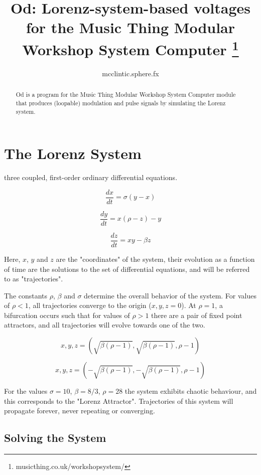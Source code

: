 \documentclass{tufte-handout}
\title{Od: Lorenz-system-based voltages for the Music Thing Modular Workshop System Computer
\thanks{musicthing.co.uk/workshopsystem/}}
\author[mcclintic.sphere.fx]{mcclintic.sphere.fx}
\begin{document}
\maketitle%

\begin{abstract}
\noindent
Od is a program for the Music Thing Modular Workshop System Computer
module that produces (loopable) modulation and pulse signals by simulating the Lorenz system.
\end{abstract}


\section{The Lorenz System}\label{sec:the-lorenz-system}

 three coupled, first-order ordinary differential equations.

$$\frac{dx}{dt} = \sigma(y - x)$$

$$\frac{dy}{dt} = x(\rho - z) - y$$

$$\frac{dz}{dt} = xy - \beta z$$

Here, $x$, $y$ and $z$ are the "coordinates" of the system, their evolution as a function of time are the solutions to the set of differential equations, and will be referred to as "trajectories".

The constants $\rho$, $\beta$ and $\sigma$ determine the overall behavior of the system. For values of $\rho < 1$, all trajectories converge to the origin ($x, y, z = 0$). At $\rho=1$, a bifurcation occurs such that for values of $\rho > 1$ there are a pair of fixed point attractors, and all trajectories will evolve towards one of the two.

$$x, y, z = (\sqrt{\beta(\rho - 1)}, \sqrt{\beta(\rho - 1)}, \rho - 1)$$

$$x, y, z = (-\sqrt{\beta(\rho - 1)}, -\sqrt{\beta(\rho - 1)}, \rho - 1)$$


For the values $\sigma=10$, $\beta=8/3$, $\rho=28$ the system exhibits chaotic behaviour, and this corresponds to the "Lorenz Attractor". Trajectories of this system will propagate forever, never repeating or converging.

\subsection{Solving the System}\label{sec:solving_the_system}
\end{document}
